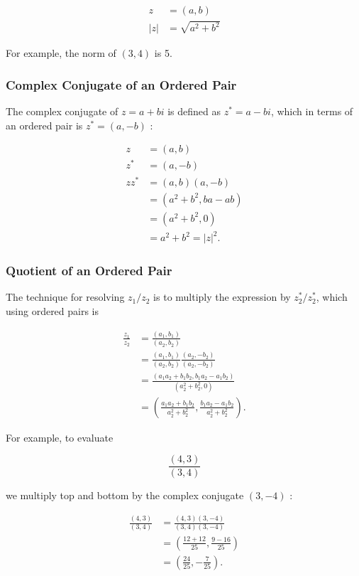 \documentclass[10pt]{article}
\begin{document}
$$
\begin{aligned}
z & =(a, b) \\
|z| & =\sqrt{a^{2}+b^{2}}
\end{aligned}
$$

For example, the norm of $(3,4)$ is 5.

\subsubsection{Complex Conjugate of an Ordered Pair}
The complex conjugate of $z=a+b i$ is defined as $z^{*}=a-b i$, which in terms of an ordered pair is $z^{*}=(a,-b)$ :

$$
\begin{aligned}
z & =(a, b) \\
z^{*} & =(a,-b) \\
z z^{*} & =(a, b)(a,-b) \\
& =\left(a^{2}+b^{2}, b a-a b\right) \\
& =\left(a^{2}+b^{2}, 0\right) \\
& =a^{2}+b^{2}=|z|^{2} .
\end{aligned}
$$

\subsubsection{Quotient of an Ordered Pair}
The technique for resolving $z_{1} / z_{2}$ is to multiply the expression by $z_{2}^{*} / z_{2}^{*}$, which using ordered pairs is

$$
\begin{aligned}
\frac{z_{1}}{z_{2}} & =\frac{\left(a_{1}, b_{1}\right)}{\left(a_{2}, b_{2}\right)} \\
& =\frac{\left(a_{1}, b_{1}\right)}{\left(a_{2}, b_{2}\right)} \frac{\left(a_{2},-b_{2}\right)}{\left(a_{2},-b_{2}\right)} \\
& =\frac{\left(a_{1} a_{2}+b_{1} b_{2}, b_{1} a_{2}-a_{1} b_{2}\right)}{\left(a_{2}^{2}+b_{2}^{2}, 0\right)} \\
& =\left(\frac{a_{1} a_{2}+b_{1} b_{2}}{a_{2}^{2}+b_{2}^{2}}, \frac{b_{1} a_{2}-a_{1} b_{2}}{a_{2}^{2}+b_{2}^{2}}\right) .
\end{aligned}
$$

For example, to evaluate

$$
\frac{(4,3)}{(3,4)}
$$

we multiply top and bottom by the complex conjugate $(3,-4)$ :

$$
\begin{aligned}
\frac{(4,3)}{(3,4)} & =\frac{(4,3)(3,-4)}{(3,4)(3,-4)} \\
& =\left(\frac{12+12}{25}, \frac{9-16}{25}\right) \\
& =\left(\frac{24}{25},-\frac{7}{25}\right) .
\end{aligned}
$$
\end{document}
